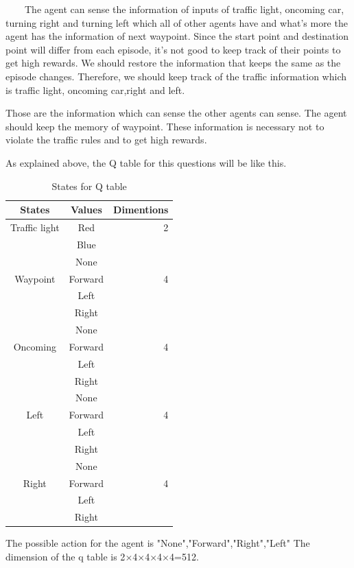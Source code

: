 \documentclass[a4paper,11pt]{article}
\begin{document}
\ \ \ \ The agent can sense the information of inputs of traffic light, oncoming car, turning right and turning left which all of other agents have and what's more the agent has the information of next waypoint.
Since the start point and destination point will differ from each episode, it's not good to keep track of their points to get high rewards.
We should restore the information that keeps the same as the episode changes. Therefore, we should keep track of the traffic information which is traffic light, oncoming car,right and left. 
\par Those are the information which can sense the other agents can sense. The agent should keep the memory of waypoint. These information is necessary not to violate the traffic rules and to get high rewards.

As explained above, the Q table for this questions will be like this.

\begin{table}[H]
\begin{center}
\caption{States for Q table}
\begin{tabular}{|c|c|r|} \hline
States & Values & Dimentions  \\ \hline
Traffic light & Red &2 \\ 
 & Blue & \\ \hline
 & None & \\
Waypoint &Forward &4\\
 &Left &\\
 & Right &\\ \hline
 & None & \\
 Oncoming&Forward &4\\
 &Left &\\
 & Right &\\ \hline
 & None & \\
 Left&Forward &4\\
 &Left &\\
 & Right &\\ \hline
 & None & \\
Right &Forward &4\\
 &Left &\\
 & Right &\\ \hline

\end{tabular}
\end{center}
\end{table}

The possible action for the agent is "None","Forward","Right","Left"
The dimension of the q table is 2$\times$4$\times$4$\times$4$\times$4=512.
\end{document}
